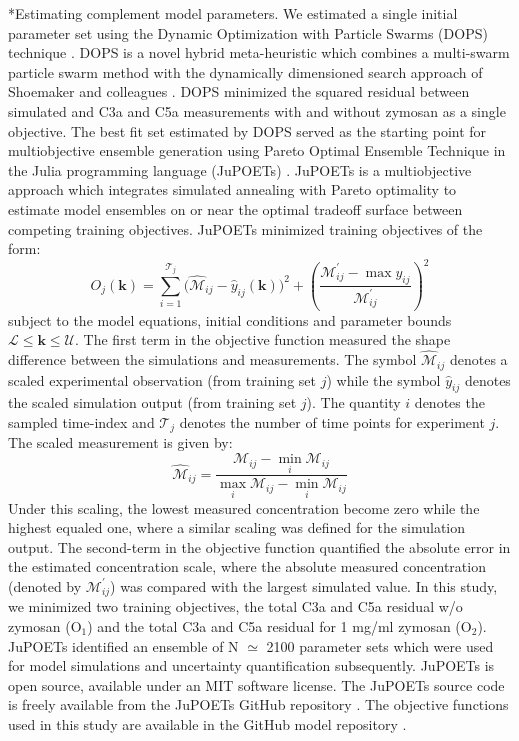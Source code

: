 \documentclass[12pt]{article}
\makeatletter
\renewcommand\subsection{\@startsection
	{subsection}{2}{0mm}
	{-0.05in}
	{-0.5\baselineskip}
	{\normalfont\normalsize\bfseries}}
\makeatother
\begin{document}
\subsection*{Estimating complement model parameters.}
We estimated a single initial parameter set using the Dynamic Optimization with Particle Swarms (DOPS) technique \cite{DOPS2016}.
DOPS is a novel hybrid meta-heuristic which combines a multi-swarm particle swarm method with the dynamically dimensioned search approach of Shoemaker and colleagues \cite{Tolson2007}.
DOPS minimized the squared residual between simulated and C3a and C5a measurements with and without zymosan as a single objective.
The best fit set estimated by DOPS served as the starting point for multiobjective ensemble generation using Pareto Optimal Ensemble Technique in the Julia programming language (JuPOETs) \cite{JuPOETs-BioArXiv}.
JuPOETs is a multiobjective approach which integrates simulated annealing with Pareto optimality to estimate model ensembles on or near the optimal tradeoff surface between competing training objectives.
JuPOETs minimized training objectives of the form:
\begin{equation}\label{eqn_cost2}
	O_{j}(\mathbf{k}) = \sum_{i=1}^{\mathcal{T}_{j}}\biggl(\hat{\mathcal{M}}_{ij}-\hat{y}_{ij}(\mathbf{k})\biggr)^2 + \left(\frac{{\mathcal{M}^{\prime}_{ij}}-\max{y_{ij}}}{{\mathcal{M}^{\prime}_{ij}}}\right)^{2}
\end{equation}subject to the model equations, initial conditions and parameter bounds $\mathcal{L}\leq\mathbf{k}\leq\mathcal{U}$.
The first term in the objective function measured the shape difference between the simulations and measurements.
The symbol $\hat{\mathcal{M}}_{ij}$ denotes a scaled experimental observation (from training set $j$) while the symbol $\hat{y}_{ij}$ denotes the scaled simulation output (from training set $j$). The quantity $i$ denotes the sampled time-index and $\mathcal{T}_{j}$ denotes the number of time points for experiment $j$.
The scaled measurement is given by:
\begin{equation}\label{norm_exp_data}
\hat{\mathcal{M}}_{ij} = \frac{\mathcal{M}_{ij} - \min_{i}\mathcal{M}_{ij}}{\max_{i}{\mathcal{M}_{ij}}-\min_{i}{\mathcal{M}_{ij}}}
\end{equation}
Under this scaling, the lowest measured concentration become zero while the highest equaled one, where a similar scaling was defined for the simulation output.
The second-term in the objective function quantified the absolute error in the estimated concentration scale, where the absolute measured
concentration (denoted by $\mathcal{M}^{\prime}_{ij}$) was compared with the largest simulated value.
In this study, we minimized two training objectives, the total C3a and C5a residual w/o zymosan (O$_{1}$) and the total C3a and C5a residual for 1 mg/ml zymosan (O$_{2}$).
JuPOETs identified an ensemble of N $\simeq$ 2100 parameter sets which were used for model simulations and uncertainty quantification subsequently.
JuPOETs is open source, available under an MIT software license.
The JuPOETs source code is freely available from the JuPOETs GitHub repository \cite{JuPOETS-GitHub}.
The objective functions used in this study are available in the GitHub model repository \cite{Varnerlab}.
\end{document}
